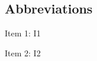 \subsection*{Abbreviations}

\begin{abbreviations}
    \item Item 1: I1
    \item Item 2: I2
\end{abbreviations}
